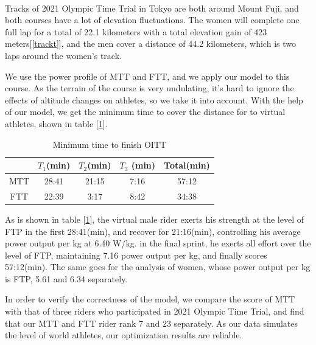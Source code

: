 \paragraph{} Tracks of 2021 Olympic Time Trial in Tokyo are both around Mount Fuji, and both courses have a lot of elevation fluctuations. The women will complete one full lap for a total of 22.1 kilometers with a total elevation gain of 423 meters[\ref{trackt}], and the men cover a distance of 44.2 kilometers, which is two laps around the women's track.

\par We use the power profile of MTT and FTT, and we apply our model to this course. As the terrain of the course is very undulating, it's hard to ignore the effects of altitude changes on athletes, so we take it into account. With the help of our model, we get the minimum time to cover the distance for to virtual athletes, shown in table [\ref{time}].
\begin{table}[htbp]
	\setlength{\belowcaptionskip}{0.2cm}
	\setlength\tabcolsep{16pt}%
	\centering
	\caption{ Minimum time to finish OITT}
	\begin{tabular}{ccccc}
		\toprule[2pt]
		&$ T_1$(min)    & $T_2$(min)    & $T_3$ (min)   & Total(min) \\
		\midrule
		MTT   & 28:41 & 21:15 & 7:16  & 57:12\\
		FTT   & 22:39 & 3:17  & 8:42  & 34:38\\
		\bottomrule[2pt]
	\end{tabular}%
	\label{time}%
\end{table}%
\par As is shown in table [\ref{time}], the virtual male rider exerts his strength at the level of FTP in the first 28:41(min), and recover for 21:16(min), controlling his average power output per kg at 6.40 W/kg. in the final sprint, he exerts all effort over the level of FTP, maintaining 7.16 power output per kg, and finally scores 57:12(min). The same goes for the analysis of women, whose power output per kg is FTP, 5.61 and 6.34 separately.
\par In order to verify the correctness of the model, we compare the score of  MTT with that of three riders who participated in 2021 Olympic Time Trial, and find that our MTT and FTT rider rank 7 and 23 separately. As our data simulates the level of world athletes, our optimization results are reliable.

